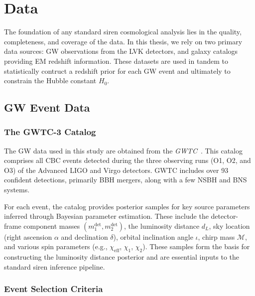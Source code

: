 \chapter{Data}
\label{chap:data}


The foundation of any standard siren cosmological analysis lies in the quality, completeness, and coverage of the data. In this thesis, we rely on two primary data sources: \ac{GW} observations from the \acf{LVK} detectors, and galaxy catalogs providing \ac{EM} redshift information. These datasets are used in tandem to statistically contruct a redshift prior for each \ac{GW} event and ultimately to constrain the Hubble constant $H_0$.

\section{\ac{GW} Event Data}

\subsection{The GWTC-3 Catalog}

The \ac{GW} data used in this study are obtained from the \textit{\acf{GWTC}}~\citep{abbott201gwtc1, abbott2021gwtc2, abbott2023gwtc3, abbott2024gwtc21}. This catalog comprises all \ac{CBC} events detected during the three observing runs (O1, O2, and O3) of the Advanced LIGO and Virgo detectors. \ac{GWTC} includes over 93 confident detections, primarily \acf{BBH} mergers, along with a few \acf{NSBH} and \acf{BNS} systems.

For each event, the catalog provides posterior samples for key source parameters inferred through Bayesian parameter estimation. These include the detector-frame component masses $(m_{1}^{\text{det}}, m_{2}^{\text{det}})$, the luminosity distance $d_L$, sky location (right ascension $\alpha$ and declination $\delta$), orbital inclination angle $\iota$, chirp mass $\mathcal{M}$, and various spin parameters (e.g., $\chi_{\text{eff}}$, $\chi_1$, $\chi_2$). These samples form the basis for constructing the luminosity distance posterior and are essential inputs to the standard siren inference pipeline.

%
\subsection{Event Selection Criteria}

